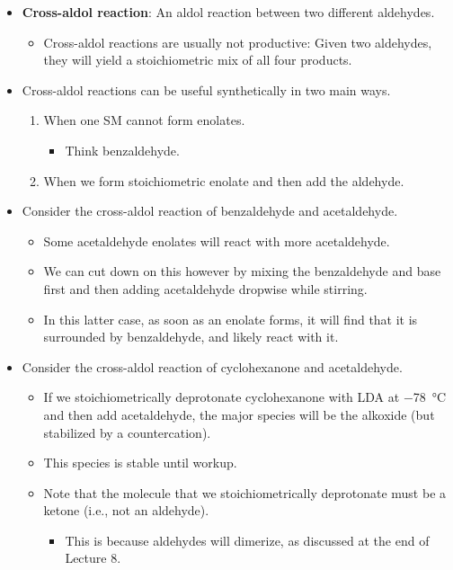 \documentclass[../notes.tex]{subfiles}
\begin{document}
\begin{itemize}
\begin{itemize}
    \end{itemize}
    \item \textbf{Cross-aldol reaction}: An aldol reaction between two different aldehydes.
    \begin{itemize}
        \item Cross-aldol reactions are usually not productive: Given two aldehydes, they will yield a stoichiometric mix of all four products.
    \end{itemize}
    \item Cross-aldol reactions can be useful synthetically in two main ways.
    \begin{enumerate}
        \item When one SM cannot form enolates.
        \begin{itemize}
            \item Think benzaldehyde.
        \end{itemize}
        \item When we form stoichiometric enolate and then add the aldehyde.
    \end{enumerate}
    \item Consider the cross-aldol reaction of benzaldehyde and acetaldehyde.
    \begin{itemize}
        \item Some acetaldehyde enolates will react with more acetaldehyde.
        \item We can cut down on this however by mixing the benzaldehyde and base first and then adding acetaldehyde dropwise while stirring.
        \item In this latter case, as soon as an enolate forms, it will find that it is surrounded by benzaldehyde, and likely react with it.
    \end{itemize}
    \item Consider the cross-aldol reaction of cyclohexanone and acetaldehyde.
    \begin{itemize}
        \item If we stoichiometrically deprotonate cyclohexanone with LDA at \SI{-78}{\celsius} and then add acetaldehyde, the major species will be the alkoxide (but stabilized by a  countercation).
        \item This species is stable until workup.
        \item Note that the molecule that we stoichiometrically deprotonate must be a ketone (i.e., not an aldehyde).
        \begin{itemize}
            \item This is because aldehydes will dimerize, as discussed at the end of Lecture 8.

\end{itemize}
\end{itemize}
\end{itemize}
\end{document}
